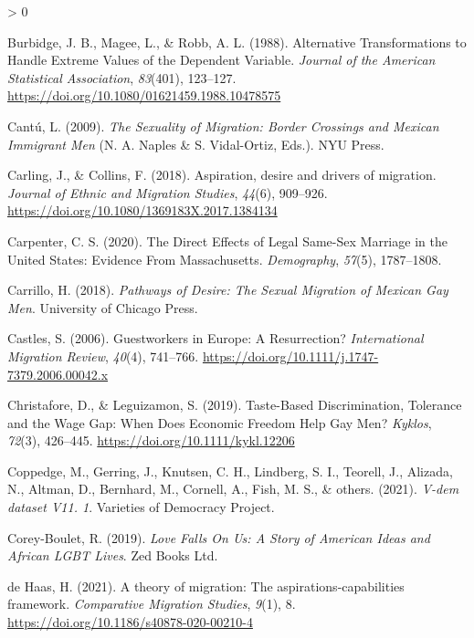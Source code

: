 \documentclass[
  11pt,
]{article}
\newlength{\cslhangindent}
\newenvironment{CSLReferences}[2] %
 {%
  \setlength{\parindent}{0pt}
  \ifodd #1 \everypar{\setlength{\hangindent}{\cslhangindent}}\ignorespaces\fi
  \ifnum #2 > 0
  \setlength{\parskip}{#2\baselineskip}
  \fi
 }%
 {}
\begin{document}
\begin{CSLReferences}{1}{0}
\leavevmode\hypertarget{ref-burbidge_1988_alternative}{}%
Burbidge, J. B., Magee, L., \& Robb, A. L. (1988). Alternative {Transformations} to {Handle Extreme Values} of the {Dependent Variable}. \emph{Journal of the American Statistical Association}, \emph{83}(401), 123--127. \url{https://doi.org/10.1080/01621459.1988.10478575}

\leavevmode\hypertarget{ref-cantu_2009}{}%
Cantú, L. (2009). \emph{The {Sexuality} of {Migration}: {Border Crossings} and {Mexican Immigrant Men}} (N. A. Naples \& S. Vidal-Ortiz, Eds.). {NYU Press}.

\leavevmode\hypertarget{ref-carling_2018_aspiration}{}%
Carling, J., \& Collins, F. (2018). Aspiration, desire and drivers of migration. \emph{Journal of Ethnic and Migration Studies}, \emph{44}(6), 909--926. \url{https://doi.org/10.1080/1369183X.2017.1384134}

\leavevmode\hypertarget{ref-carpenter_2020}{}%
Carpenter, C. S. (2020). The {Direct Effects} of {Legal Same}-{Sex Marriage} in the {United States}: {Evidence From Massachusetts}. \emph{Demography}, \emph{57}(5), 1787--1808.

\leavevmode\hypertarget{ref-carrillo_2018}{}%
Carrillo, H. (2018). \emph{Pathways of {Desire}: {The Sexual Migration} of {Mexican Gay Men}}. {University of Chicago Press}.

\leavevmode\hypertarget{ref-castles_2006}{}%
Castles, S. (2006). Guestworkers in {Europe}: {A Resurrection}? \emph{International Migration Review}, \emph{40}(4), 741--766. \url{https://doi.org/10.1111/j.1747-7379.2006.00042.x}

\leavevmode\hypertarget{ref-christafore_2019}{}%
Christafore, D., \& Leguizamon, S. (2019). Taste-{Based Discrimination}, {Tolerance} and the {Wage Gap}: {When Does Economic Freedom Help Gay Men}? \emph{Kyklos}, \emph{72}(3), 426--445. \url{https://doi.org/10.1111/kykl.12206}

\leavevmode\hypertarget{ref-coppedge_2021}{}%
Coppedge, M., Gerring, J., Knutsen, C. H., Lindberg, S. I., Teorell, J., Alizada, N., Altman, D., Bernhard, M., Cornell, A., Fish, M. S., \& others. (2021). \emph{V-dem dataset V11. 1}. {Varieties of Democracy Project}.

\leavevmode\hypertarget{ref-corey-boulet_2019}{}%
Corey-Boulet, R. (2019). \emph{Love {Falls On Us}: {A Story} of {American Ideas} and {African LGBT Lives}}. {Zed Books Ltd.}

\leavevmode\hypertarget{ref-dehaas_2021}{}%
de Haas, H. (2021). A theory of migration: The aspirations-capabilities framework. \emph{Comparative Migration Studies}, \emph{9}(1), 8. \url{https://doi.org/10.1186/s40878-020-00210-4}


\end{CSLReferences}
\end{document}
